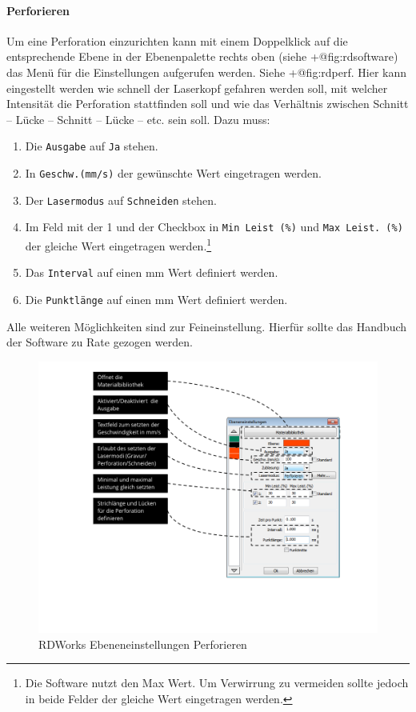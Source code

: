 \documentclass[]{article}
\providecommand{\tightlist}{%
  \setlength{\itemsep}{0pt}\setlength{\parskip}{0pt}}
\let\oldparagraph\paragraph
\renewcommand{\paragraph}[1]{\oldparagraph{#1}\mbox{}}
\begin{document}
\hypertarget{perforieren}{%
\paragraph{Perforieren}\label{perforieren}}

Um eine Perforation einzurichten kann mit einem Doppelklick auf die
entsprechende Ebene in der Ebenenpalette rechts oben (siehe
+@fig:rdsoftware) das Menü für die Einstellungen aufgerufen werden.
Siehe +@fig:rdperf. Hier kann eingestellt werden wie schnell der
Laserkopf gefahren werden soll, mit welcher Intensität die Perforation
stattfinden soll und wie das Verhältnis zwischen Schnitt -- Lücke --
Schnitt -- Lücke -- etc. sein soll. Dazu muss:

\begin{enumerate}
\def\labelenumi{\arabic{enumi}.}
\tightlist
\item
  Die \texttt{Ausgabe} auf \texttt{Ja} stehen.
\item
  In \texttt{Geschw.(mm/s)} der gewünschte Wert eingetragen werden.
\item
  Der \texttt{Lasermodus} auf \texttt{Schneiden} stehen.
\item
  Im Feld mit der 1 und der Checkbox in \texttt{Min\ Leist\ (\%)} und
  \texttt{Max\ Leist.\ (\%)} der gleiche Wert eingetragen
  werden.\footnote{Die Software nutzt den Max Wert. Um Verwirrung zu
    vermeiden sollte jedoch in beide Felder der gleiche Wert eingetragen
    werden.}
\item
  Das \texttt{Interval} auf einen mm Wert definiert werden.
\item
  Die \texttt{Punktlänge} auf einen mm Wert definiert werden.
\end{enumerate}

Alle weiteren Möglichkeiten sind zur Feineinstellung. Hierfür sollte das
Handbuch der Software zu Rate gezogen werden.

\begin{figure}
\hypertarget{fig:rdperf}{%
\centering
\includegraphics{assets/images/rdworks-perforieren.PNG}
\caption{RDWorks Ebeneneinstellungen Perforieren}\label{fig:rdperf}
}
\end{figure}
\end{document}
